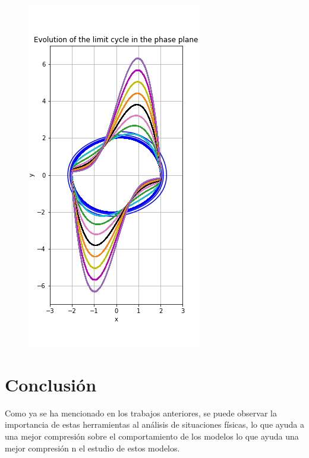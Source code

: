 \documentclass{article}
\begin{document}
\begin{figure}[h]
\centering
\includegraphics[scale=0.35]{Image2.png}
\end{figure}

\section{Conclusión}
Como ya se ha mencionado en los trabajos anteriores, se puede observar la importancia de estas herramientas al análisis de situaciones físicas, lo que ayuda a una mejor compresión sobre el comportamiento de los modelos lo que ayuda una mejor compresión n el estudio de estos modelos.
\end{document}
